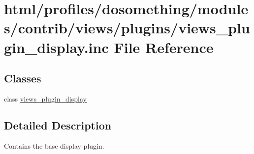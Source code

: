 \hypertarget{views__plugin__display_8inc}{
\section{html/profiles/dosomething/modules/contrib/views/plugins/views\_\-plugin\_\-display.inc File Reference}
\label{views__plugin__display_8inc}
}
\subsection*{Classes}
\begin{DoxyCompactItemize}
\item 
class \hyperlink{classviews__plugin__display}{views\_\-plugin\_\-display}
\end{DoxyCompactItemize}


\subsection{Detailed Description}
Contains the base display plugin. 